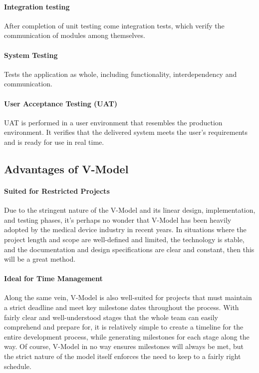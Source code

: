 \documentclass[main.tex]{subfiles}
\begin{document}
\paragraph{Integration testing}
After completion of unit testing come integration tests, which verify the communication of modules among themselves.

\paragraph{System Testing}
Tests the application as whole, including functionality, interdependency and communication.

\paragraph{User Acceptance Testing (UAT)}
UAT is performed in a user environment that resembles the production environment. It verifies that the delivered system meets the user’s requirements and is ready for use in real time.

\subsection{Advantages of V-Model}

\paragraph{Suited for Restricted Projects}
Due to the stringent nature of the V-Model and its linear design, implementation, and testing phases, it's perhaps no wonder that V-Model has been heavily adopted by the medical device industry in recent years.
In situations where the project length and scope are well-defined and limited, the technology is stable, and the documentation and design specifications are clear and constant, then this will be a great method.

\paragraph{Ideal for Time Management}
Along the same vein, V-Model is also well-suited for projects that must maintain a strict deadline and meet key milestone dates throughout the process.
With fairly clear and well-understood stages that the whole team can easily comprehend and prepare for, it is relatively simple to create a timeline for the entire development process, while generating milestones for each stage along the way. Of course, V-Model in no way ensures milestones will always be met, but the strict nature of the model itself enforces the need to keep to a fairly right schedule.
\end{document}

